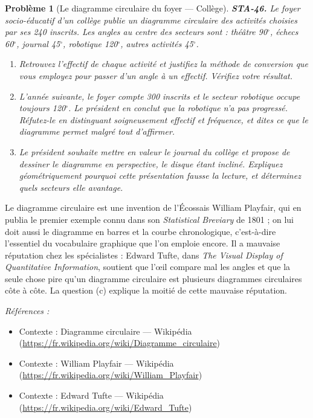 \documentclass[11pt]{article}
\newtheorem{problem}{Problème}
\newenvironment{refs}{\par\small\noindent\emph{Références :}\begin{itemize}\setlength\itemsep{0pt}}{\end{itemize}\normalsize}
\begin{document}
\begin{problem}[{Le diagramme circulaire du foyer --- Collège}]
\textbf{STA-46.} Le foyer socio-éducatif d'un collège publie un diagramme circulaire des
activités choisies par ses 240 inscrits. Les angles au centre des secteurs sont : théâtre 90$^\circ$,
échecs 60$^\circ$, journal 45$^\circ$, robotique 120$^\circ$, autres activités 45$^\circ$.
\begin{enumerate}
\item[(a)] Retrouvez l'effectif de chaque activité et justifiez la méthode de conversion que vous
employez pour passer d'un angle à un effectif. Vérifiez votre résultat.
\item[(b)] L'année suivante, le foyer compte 300 inscrits et le secteur \og{} robotique \fg{} occupe toujours
120$^\circ$. Le président en conclut que la robotique n'a pas progressé. Réfutez-le en distinguant
soigneusement effectif et fréquence, et dites ce que le diagramme permet malgré tout
d'affirmer.
\item[(c)] Le président souhaite mettre en valeur le journal du collège et propose de dessiner le
diagramme en perspective, le disque étant incliné. Expliquez géométriquement pourquoi cette
présentation fausse la lecture, et déterminez quels secteurs elle avantage.
\end{enumerate}

\end{problem}

\noindent Le diagramme circulaire est une invention de l'Écossais William Playfair, qui en
publia le premier exemple connu dans son \textit{Statistical Breviary} de 1801 ; on lui doit aussi le
diagramme en barres et la courbe chronologique, c'est-à-dire l'essentiel du vocabulaire graphique
que l'on emploie encore. Il a mauvaise réputation chez les spécialistes : Edward Tufte, dans
\textit{The Visual Display of Quantitative Information}, soutient que l'\oe{}il compare mal les angles et
que la seule chose pire qu'un diagramme circulaire est plusieurs diagrammes circulaires côte à
côte. La question (c) explique la moitié de cette mauvaise réputation.

\begin{refs}
\item Contexte : Diagramme circulaire --- Wikipédia (\url{https://fr.wikipedia.org/wiki/Diagramme_circulaire})
\item Contexte : William Playfair --- Wikipédia (\url{https://fr.wikipedia.org/wiki/William_Playfair})
\item Contexte : Edward Tufte --- Wikipédia (\url{https://fr.wikipedia.org/wiki/Edward_Tufte})
\end{refs}
\end{document}
